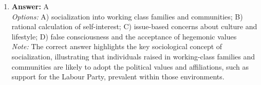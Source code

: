 \documentclass[12pt]{article}
\begin{document}
\begin{enumerate}[label=\arabic*.]
\\ \textit{Note:} The correct answer is supported by the concept that societal standards and cultural ideals create pressures for women to conform to certain beauty norms, leading them to view specific aspects of their bodies as stigmatizing and in need of modification through cosmetic surgery.
\item \textbf{Answer:} A
\\ \textit{Options:} A) socialization into working class families and communities; B) rational calculation of self-interest; C) issue-based concerns about culture and lifestyle; D) false consciousness and the acceptance of hegemonic values
\\ \textit{Note:} The correct answer highlights the key sociological concept of socialization, illustrating that individuals raised in working-class families and communities are likely to adopt the political values and affiliations, such as support for the Labour Party, prevalent within those environments.
\end{enumerate}
\end{document}
